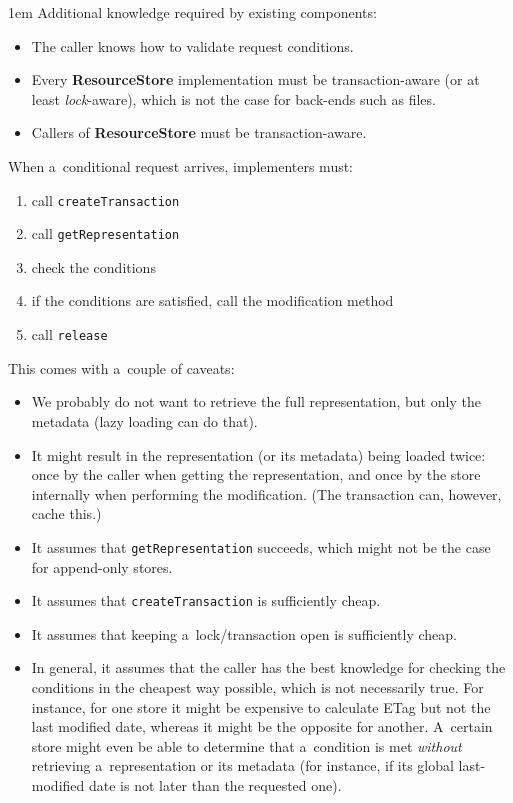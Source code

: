 \documentclass[10pt]{article}
\newenvironment{Note}
  {\begin{multicols}{3}%
     \parskip 1em}
  {\end{multicols}}
\begin{document}
\begin{Note}
Additional knowledge required by existing components:
\begin{itemize}
  \item The caller knows how to validate request conditions.

  \item Every \textbf{ResourceStore} implementation must be transaction-aware
        (or at least \emph{lock}-aware),
        which is not the case for back-ends such as files.

  \item Callers of \textbf{ResourceStore} must be transaction-aware.
\end{itemize}

\bigskip
When a~conditional request arrives, implementers must:
\begin{enumerate}
  \item call \verb!createTransaction!
  \item call \verb!getRepresentation!
  \item check the conditions
  \item if the conditions are satisfied, call the modification method
  \item call \verb!release!
\end{enumerate}

\bigskip
This comes with a~couple of caveats:
\begin{itemize}
  \item We probably do not want to retrieve the full representation,
        but only the metadata (lazy loading can do that).

  \item It might result in the representation (or its metadata)
        being loaded twice:
        once by the caller when getting the representation,
        and once by the store internally when performing the modification.
        (The transaction can, however, cache this.)

  \item It assumes that \verb!getRepresentation! succeeds,
        which might not be the case for append-only stores.

  \item It assumes that \verb!createTransaction! is sufficiently cheap.

  \item It assumes that keeping a~lock/transaction open is sufficiently cheap.

  \item In general,
        it assumes that the caller has the best knowledge
        for checking the conditions in the cheapest way possible,
        which is not necessarily true.
        For instance,
        for one store it might be expensive to calculate ETag
        but not the last modified date,
        whereas it might be the opposite for another.
        A~certain store might even be able to determine
        that a~condition is met \emph{without} retrieving
        a~representation or its metadata
        (for instance, if its global last-modified date
         is not later than the requested one).
\end{itemize}


\end{Note}
\end{document}
